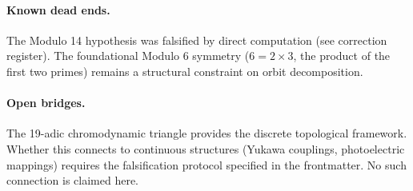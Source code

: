 \paragraph{Known dead ends.} The Modulo 14 hypothesis was falsified by direct computation (see correction register). The foundational Modulo 6 symmetry ($6 = 2 \times 3$, the product of the first two primes) remains a structural constraint on orbit decomposition.

\paragraph{Open bridges.} The 19-adic chromodynamic triangle provides the discrete topological framework. Whether this connects to continuous structures (Yukawa couplings, photoelectric mappings) requires the falsification protocol specified in the frontmatter. No such connection is claimed here.

